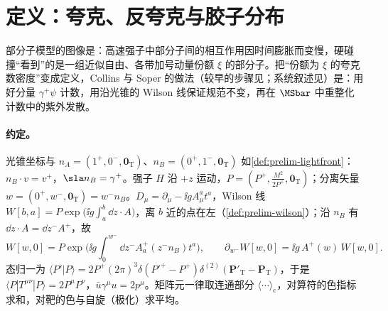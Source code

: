 \section{定义：夸克、反夸克与胶子分布}\label{sec:pdf-definitions}

部分子模型的图像是：高速强子中部分子间的相互作用因时间膨胀而变慢，硬碰撞“看到”的是一组近似自由、各带加号动量份额 $\xi$ 的部分子。把“份额为 $\xi$ 的夸克数密度”变成定义，Collins 与 Soper 的做法\cite{CollinsSoper1982a}（较早的步骤见\cite{Soper:1976jc,Soper:1979fq}；系统叙述见\cite[第~6.3~节、第~7.5--7.6~节]{Collins2011}）是：用好分量 $\gamma^+\psi$ 计数，用沿光锥的 Wilson 线保证规范不变，再在 $\MSbar$ 中重整化计数中的紫外发散。

\paragraph{约定。}
光锥坐标与 $n_A=(1^+,0^-,\bm 0_{\mathrm T})$、$n_B=(0^+,1^-,\bm 0_{\mathrm T})$ 如\cref{def:prelim-lightfront}：$n_B\cdot v=v^+$，$\sla n_B=\gamma^+$。强子 $H$ 沿 $+z$ 运动，$P=(P^+,\frac{M^2}{2P^+},\bm 0_{\mathrm T})$；分离矢量 $w=(0^+,w^-,\bm 0_{\mathrm T})=w^-n_B$。$D_\mu=\partial_\mu-\ii gA^a_\mu t^a$，Wilson 线 $W[b,a]=P\exp\big(\ii g\int_a^b\dd z\cdot A\big)$，离 $b$ 近的点在左（\cref{def:prelim-wilson}）；沿 $n_B$ 有 $\dd z\cdot A=\dd z^-A^+$，故
\begin{equation}\label{eq:pdf-W}
W[w,0]=P\exp\Big(\ii g\!\int_0^{w^-}\!\dd z^-A^{+}_a(z^-n_B)t^a\Big),\qquad \partial_{w^-}W[w,0]=\ii g\,A^+(w)\,W[w,0].
\end{equation}
态归一为 $\langle P'|P\rangle=2P^+(2\pi)^3\delta(P'^+-P^+)\delta^{(2)}(\bm P'_{\mathrm T}-\bm P_{\mathrm T})$，于是 $\langle P|T^{\mu\nu}|P\rangle=2P^\mu P^\nu$，$\bar u\gamma^\mu u=2p^\mu$。矩阵元一律取连通部分 $\langle\cdots\rangle_{\mathrm c}$，对算符的色指标求和，对靶的色与自旋（极化）求平均。

